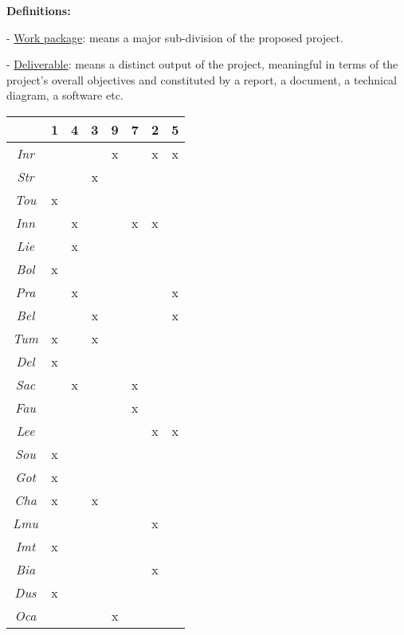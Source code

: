 \begin{todo}{}
  {\bf Definitions:}

  - \underline{Work package}: means a major sub-division of the proposed project.

  - \underline{Deliverable}: means a distinct output of the project, meaningful in terms of the project's overall objectives and constituted by a report, a document, a technical diagram, a software etc.
\end{todo}

\begin{center}
\begin{tabular}{|c|c|c|c|c|c|c|c|}
\hline
    & 1 & 4 & 3 & 9 & 7 & 2 & 5 \\
\hline
\textsl{Inr} &   &   &   & x &   & x & x \\
\hline
\textsl{Str} &   &   & x &   &   &   &   \\
\hline
\textsl{Tou} & x &   &   &   &   &   &   \\
\hline
\textsl{Inn} &   & x &   &   & x & x &   \\
\hline
\textsl{Lie} &   & x &   &   &   &   &   \\
\hline
\textsl{Bol} & x &   &   &   &   &   &   \\
\hline
\textsl{Pra} &   & x &   &   &   &   & x \\
\hline
\textsl{Bel} &   &   & x &   &   &   & x \\
\hline
\textsl{Tum} & x &   & x &   &   &   &   \\
\hline
\textsl{Del} & x &   &   &   &   &   &   \\
\hline
\textsl{Sac} &   & x &   &   & x &   &   \\
\hline
\textsl{Fau} &   &   &   &   & x &   &   \\
\hline
\textsl{Lee} &   &   &   &   &   & x & x \\
\hline
\textsl{Sou} & x &   &   &   &   &   &   \\
\hline
\textsl{Got} & x &   &   &   &   &   &   \\
\hline
\textsl{Cha} & x &   & x &   &   &   &   \\
\hline
\textsl{Lmu} &   &   &   &   &   & x &   \\
\hline
\textsl{Imt} & x &   &   &   &   &   &   \\
\hline
\textsl{Bia} &   &   &   &   &   & x &   \\
\hline
\textsl{Dus} & x &   &   &   &   &   &   \\
\hline
\textsl{Oca} &   &   &   & x &   &   &   \\

\end{tabular}
\end{center}
